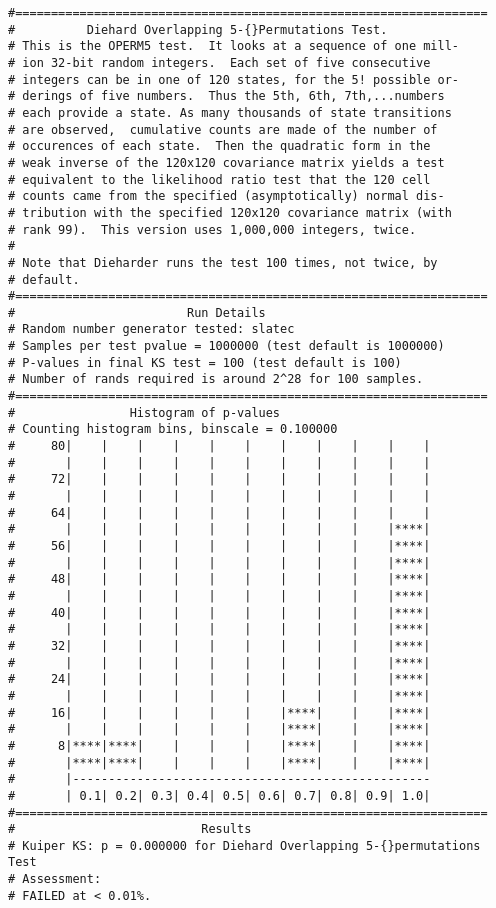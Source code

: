 \documentclass[12pt]{book}
\begin{document}
{\begin{verbatim}
#==================================================================
#          Diehard Overlapping 5-{}Permutations Test.
# This is the OPERM5 test.  It looks at a sequence of one mill- 
# ion 32-bit random integers.  Each set of five consecutive     
# integers can be in one of 120 states, for the 5! possible or- 
# derings of five numbers.  Thus the 5th, 6th, 7th,...numbers   
# each provide a state. As many thousands of state transitions  
# are observed,  cumulative counts are made of the number of    
# occurences of each state.  Then the quadratic form in the     
# weak inverse of the 120x120 covariance matrix yields a test   
# equivalent to the likelihood ratio test that the 120 cell     
# counts came from the specified (asymptotically) normal dis-   
# tribution with the specified 120x120 covariance matrix (with  
# rank 99).  This version uses 1,000,000 integers, twice.       
#
# Note that Dieharder runs the test 100 times, not twice, by
# default.
#==================================================================
#                        Run Details
# Random number generator tested: slatec
# Samples per test pvalue = 1000000 (test default is 1000000)
# P-values in final KS test = 100 (test default is 100)
# Number of rands required is around 2^28 for 100 samples.
#==================================================================
#                Histogram of p-values
# Counting histogram bins, binscale = 0.100000
#     80|    |    |    |    |    |    |    |    |    |    |
#       |    |    |    |    |    |    |    |    |    |    |
#     72|    |    |    |    |    |    |    |    |    |    |
#       |    |    |    |    |    |    |    |    |    |    |
#     64|    |    |    |    |    |    |    |    |    |    |
#       |    |    |    |    |    |    |    |    |    |****|
#     56|    |    |    |    |    |    |    |    |    |****|
#       |    |    |    |    |    |    |    |    |    |****|
#     48|    |    |    |    |    |    |    |    |    |****|
#       |    |    |    |    |    |    |    |    |    |****|
#     40|    |    |    |    |    |    |    |    |    |****|
#       |    |    |    |    |    |    |    |    |    |****|
#     32|    |    |    |    |    |    |    |    |    |****|
#       |    |    |    |    |    |    |    |    |    |****|
#     24|    |    |    |    |    |    |    |    |    |****|
#       |    |    |    |    |    |    |    |    |    |****|
#     16|    |    |    |    |    |    |****|    |    |****|
#       |    |    |    |    |    |    |****|    |    |****|
#      8|****|****|    |    |    |    |****|    |    |****|
#       |****|****|    |    |    |    |****|    |    |****|
#       |--------------------------------------------------
#       | 0.1| 0.2| 0.3| 0.4| 0.5| 0.6| 0.7| 0.8| 0.9| 1.0|
#==================================================================
#                          Results
# Kuiper KS: p = 0.000000 for Diehard Overlapping 5-{}permutations Test
# Assessment:
# FAILED at < 0.01%.


\end{verbatim}}
\end{document}

